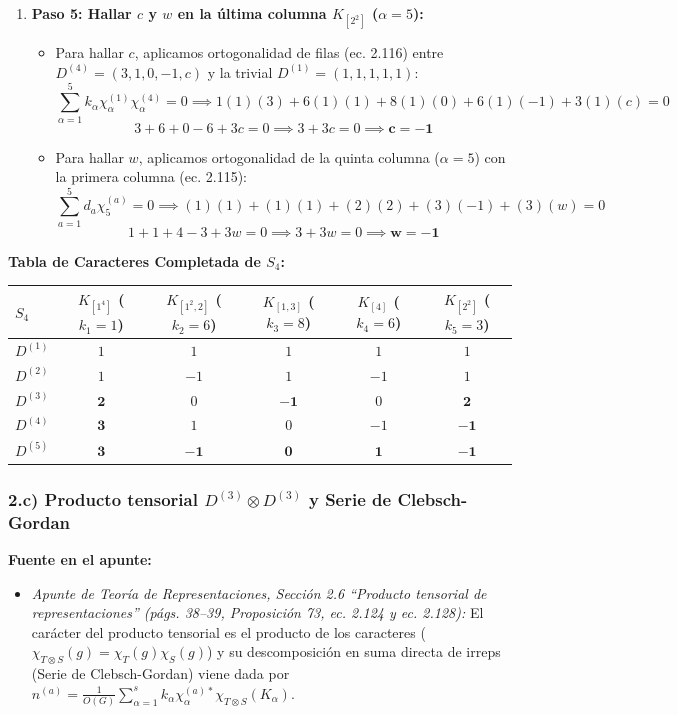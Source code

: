 \documentclass[11pt, a4paper]{article}
\begin{document}
\begin{enumerate}
    \item \textbf{Paso 5: Hallar $c$ y $w$ en la última columna $K_{[2^2]}$ ($\alpha = 5$):}
    \begin{itemize}
        \item Para hallar $c$, aplicamos ortogonalidad de filas (ec. 2.116) entre $D^{(4)} = (3, 1, 0, -1, c)$ y la trivial $D^{(1)} = (1, 1, 1, 1, 1)$:
        \[
        \sum_{\alpha=1}^5 k_\alpha \chi_\alpha^{(1)} \chi_\alpha^{(4)} = 0 \implies 1(1)(3) + 6(1)(1) + 8(1)(0) + 6(1)(-1) + 3(1)(c) = 0
        \]
        \[
        3 + 6 + 0 - 6 + 3c = 0 \implies 3 + 3c = 0 \implies \mathbf{c = -1}
        \]
        \item Para hallar $w$, aplicamos ortogonalidad de la quinta columna ($\alpha = 5$) con la primera columna (ec. 2.115):
        \[
        \sum_{a=1}^5 d_a \chi_5^{(a)} = 0 \implies (1)(1) + (1)(1) + (2)(2) + (3)(-1) + (3)(w) = 0
        \]
        \[
        1 + 1 + 4 - 3 + 3w = 0 \implies 3 + 3w = 0 \implies \mathbf{w = -1}
        \]
    \end{itemize}
\end{enumerate}

\textbf{Tabla de Caracteres Completada de $S_4$:}
\begin{center}
\begin{tabular}{lccccc}
\toprule
$S_4$ & $K_{[1^4]}$ ($k_1 = 1$) & $K_{[1^2, 2]}$ ($k_2 = 6$) & $K_{[1, 3]}$ ($k_3 = 8$) & $K_{[4]}$ ($k_4 = 6$) & $K_{[2^2]}$ ($k_5 = 3$) \\
\midrule
$D^{(1)}$ & $1$ & $1$ & $1$ & $1$ & $1$ \\
$D^{(2)}$ & $1$ & $-1$ & $1$ & $-1$ & $1$ \\
$D^{(3)}$ & $\mathbf{2}$ & $0$ & $\mathbf{-1}$ & $0$ & $\mathbf{2}$ \\
$D^{(4)}$ & $\mathbf{3}$ & $1$ & $0$ & $-1$ & $\mathbf{-1}$ \\
$D^{(5)}$ & $\mathbf{3}$ & $\mathbf{-1}$ & $\mathbf{0}$ & $\mathbf{1}$ & $\mathbf{-1}$ \\
\bottomrule
\end{tabular}
\end{center}

\subsubsection*{2.c) Producto tensorial $D^{(3)} \otimes D^{(3)}$ y Serie de Clebsch-Gordan}
\textbf{Fuente en el apunte:}
\begin{itemize}
    \item \textit{Apunte de Teoría de Representaciones, Sección 2.6 ``Producto tensorial de representaciones'' (págs. 38--39, Proposición 73, ec. 2.124 y ec. 2.128):} El carácter del producto tensorial es el producto de los caracteres ($\chi_{T \otimes S}(g) = \chi_T(g) \chi_S(g)$) y su descomposición en suma directa de irreps (Serie de Clebsch-Gordan) viene dada por $n^{(a)} = \frac{1}{O(G)} \sum_{\alpha=1}^s k_\alpha \chi_\alpha^{(a)*} \chi_{T \otimes S}(K_\alpha)$.
\end{itemize}
\end{document}
